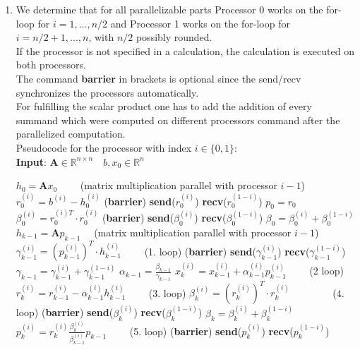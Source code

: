 \documentclass{article}
\begin{document}
\begin{enumerate}[label=(\alph*)]
\item
We determine that for all parallelizable parts Processor 0 works on the for-loop for $i = 1,...,n/2$ and Processor 1 works on the for-loop for $i = n/2+1,...,n$, with $n/2$ possibly rounded.\\
If the processor is not specified in a calculation, the calculation is executed on both processors.
\\
The command \textbf{barrier} in brackets is optional since the send/recv synchronizes the processors automatically.
\\
For fulfilling the scalar product one has to add the addition of every summand which were computed on different processors command after the parallelized computation.
\\
Pseudocode for the processor with index $i\in\{0,1\}$:
\\
   \textbf{Input}: $ \textbf{A} \in \mathbb{R}^{n\times n} \quad b, x_0\in \mathbb{R}^n$
    \begin{algorithmic}[1]
	\State $h_{0} = \textbf{A}x_{0}\qquad $ (matrix multiplication parallel with processor $i-1$)
	\State $r^{(i)}_0 = b^{(i)} - h_0^{(i)}$
	\State (\textbf{barrier}) 
	\State \textbf{send}($r_0^{(i)}$)
	\State \textbf{recv}($r_0^{(1-i)}$)
	\State $p_0 = r_0$
	\State $\beta_0^{(i)} = r^{(i)T}_0\cdot r^{(i)}_0$
		\State (\textbf{barrier}) 
	\State \textbf{send}($\beta_0^{(i)}$)
	\State \textbf{recv}($\beta_0^{(1-i)}$)
	\State $\beta_0=\beta_0^{(i)}+\beta_0^{(1-i)}$
	\State $h_{k-1} = \textbf{A}p_{k-1}\quad$ \small(matrix multiplication parallel with processor $i-1$)\normalsize
	\State $\gamma^{(i)}_{k-1} = (p^{(i)}_{k-1})^T\cdot h^{(i)}_{k-1}\qquad$ (1. loop)
			\State (\textbf{barrier}) 
	\State \textbf{send}($\gamma_{k-1}^{(i)}$)
	\State \textbf{recv}($\gamma_{k-1}^{(1-i)}$)
	\State $\gamma_{k-1} = \gamma_{k-1}^{(i)}+\gamma_{k-1}^{(1-i)}$
	\State $\alpha_{k-1} = \frac{\beta_{k-1}}{\gamma_{k-1}}$
	\State $x^{(i)}_k = x^{(i)}_{k-1} + \alpha^{(i)}_{k-1}p^{(i)}_{k-1}\qquad$ (2 loop)
	\State $r^{(i)}_k = r^{(i)}_{k-1} - \alpha^{(i)}_{k-1}h^{(i)}_{k-1}\qquad$ (3. loop)
	\State $\beta^{(i)}_k = (r^{(i)}_k)^T\cdot r^{(i)}_k\qquad \qquad $ (4. loop)
				\State (\textbf{barrier}) 
	\State \textbf{send}($\beta_k^{(i)}$)
	\State \textbf{recv}($\beta_k^{(1-i)}$)
	\State $\beta_k = \beta_k^{(i)}+\beta_k^{(1-i)}$
	\State $p^{(i)}_k = r^{(i)}_{k}  \frac{\beta^{(i)}_k}{\beta^{(i)}_{k-1}}p_{k-1}\qquad$ (5. loop)
	\State (\textbf{barrier}) 
	\State \textbf{send}($p_k^{(i)}$)
	\State \textbf{recv}($p_k^{(1-i)}$)
	\EndFor
    \end{algorithmic}


\end{enumerate}
\end{document}
